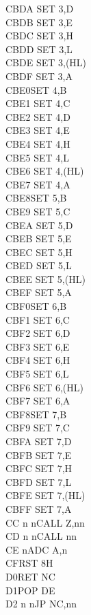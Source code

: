 \documentclass[oneside,a4paper]{book}
\begin{document}
\begin{multicols}{3}
{\begin{tabbing}
CBDA\> 	SET 3,D\\
CBDB\> 	SET 3,E\\
CBDC\> 	SET 3,H\\
CBDD\> 	SET 3,L\\
CBDE\> 	SET 3,(HL)\\
CBDF\> 	SET 3,A\\
CBE0\>SET 4,B\\
CBE1\> 	SET 4,C\\
CBE2\> 	SET 4,D\\
CBE3\> 	SET 4,E\\
CBE4\> 	SET 4,H\\
CBE5\> 	SET 4,L\\
CBE6\> 	SET 4,(HL)\\
CBE7\> 	SET 4,A\\
CBE8\>SET 5,B\\
CBE9\> 	SET 5,C\\
CBEA\> 	SET 5,D\\
CBEB\> 	SET 5,E\\
CBEC\> 	SET 5,H\\
CBED\> 	SET 5,L\\
CBEE\> 	SET 5,(HL)\\
CBEF\> 	SET 5,A\\
CBF0\>SET 6,B\\
CBF1\> 	SET 6,C\\
CBF2\> 	SET 6,D\\
CBF3\> 	SET 6,E\\
CBF4\> 	SET 6,H\\
CBF5\> 	SET 6,L\\
CBF6\> 	SET 6,(HL)\\
CBF7\> 	SET 6,A\\
CBF8\>SET 7,B\\
CBF9\> 	SET 7,C\\
CBFA\> 	SET 7,D\\
CBFB\> 	SET 7,E\\
CBFC\> 	SET 7,H\\
CBFD\> 	SET 7,L\\
CBFE\> 	SET 7,(HL)\\
CBFF\> 	SET 7,A\\
CC n n\>CALL Z,nn\\
CD n n\>CALL nn\\
CE n\>ADC A,n\\
CF\>RST 8H\\
D0\>RET NC\\
D1\>POP DE\\
D2 n n\>JP NC,nn\\

\end{tabbing}}
\end{multicols}
\end{document}
